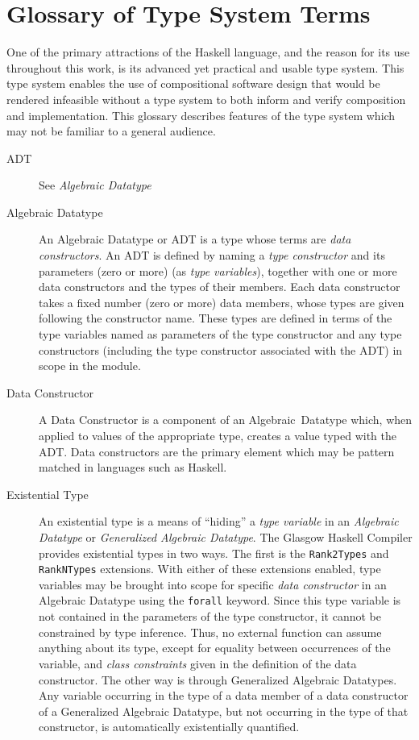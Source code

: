 \chapter{Glossary of Type System Terms}
\label{chapter:Glossary_of_Type_System_Terms}

One of the primary attractions of the Haskell language, and the reason for its
use throughout this work, is its advanced yet practical and usable type system.
This type system enables the use of compositional software design that would
be rendered infeasible without a type system to both inform and verify
composition and implementation. This glossary describes features of the type
system which may not be familiar to a general audience.

\begin{description}
\item[ADT] See {\em Algebraic Datatype}

\item[Algebraic Datatype] An Algebraic Datatype or ADT is a type whose terms
are {\em data constructors}. An ADT is defined by naming a
{\em type constructor} and its parameters (zero or more)
(as {\em type variables}), together with one or more data constructors and the
types of their members. Each data constructor takes a fixed number
(zero or more) data members, whose types are given following the constructor
name. These types are defined in terms of the type variables named as parameters
of the type constructor and any type constructors (including the type
constructor associated with the ADT) in scope in the module.

\item[Data Constructor] A Data Constructor is a component of an
Algebraic~Datatype which, when applied to values of the appropriate type, 
creates a value typed with the ADT. Data constructors are the primary element
which may be pattern matched in languages such as Haskell.

\item[Existential Type] An existential type is a means of ``hiding'' a
{\em type variable} in an {\em Algebraic Datatype} or
{\em Generalized Algebraic Datatype}. The Glasgow Haskell Compiler provides
existential types in two ways. The first is the {\tt Rank2Types} and
{\tt RankNTypes} extensions. With either of these extensions enabled,
type variables may be brought into scope for specific {\em data constructor} in
an Algebraic Datatype using the {\tt forall} keyword. Since this
type variable is not contained in the parameters of the type constructor, it
cannot be constrained by type inference. Thus, no external function can assume
anything about its type, except for equality between occurrences of the
variable, and {\em class constraints} given in the definition of the data
constructor. The other way is through Generalized Algebraic Datatypes. Any
variable occurring in the type of a data member of a data constructor of a
Generalized Algebraic Datatype, but not occurring in the type of that
constructor, is automatically existentially quantified.



\end{description}
